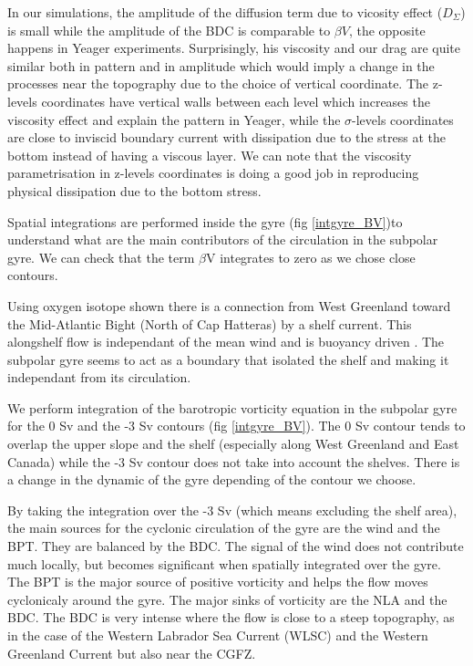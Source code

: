 \documentclass{ametsoc}
\begin{document}
In our simulations, the amplitude of the diffusion term due to vicosity effect ($D_{\Sigma}$) is small while the amplitude of the BDC is comparable to $\beta V$, the opposite happens in Yeager experiments. Surprisingly, his viscosity and our drag are quite similar both in pattern and in amplitude which would imply a change in the processes near the topography due to the choice of vertical coordinate. The z-levels coordinates have vertical walls between each level which increases the viscosity effect and explain the pattern in Yeager, while the $\sigma$-levels coordinates are close to inviscid boundary current with dissipation due to the stress at the bottom instead of having a viscous layer. We can note that the viscosity parametrisation  in z-levels coordinates is doing a good job in reproducing physical dissipation due to the bottom stress.


Spatial integrations are performed inside the gyre (fig \ref{intgyre_BV})to understand what are the main contributors of the circulation in the subpolar gyre. We can check that the term $\beta$V integrates to zero as we chose close contours.

Using oxygen isotope \citet{chapman1986,chapman1989} shown there is a connection from West Greenland toward the Mid-Atlantic Bight (North of Cap Hatteras) by a shelf current. This alongshelf flow is independant of the mean wind and is buoyancy driven \citep{csanady1978}. The subpolar gyre seems to act as a boundary that isolated the shelf and making it independant from its circulation. 

We perform integration of the barotropic vorticity equation in the subpolar gyre for the 0 Sv and the -3 Sv contours (fig \ref{intgyre_BV}). The 0 Sv contour tends to overlap the upper slope and the shelf (especially along West Greenland and East Canada) while the -3 Sv contour does not take into account the shelves. There is a change in the dynamic of the gyre depending of the contour we choose.

By taking the integration over the -3 Sv (which means excluding the shelf area), the main sources for the cyclonic circulation of the gyre are the wind and the BPT. They are balanced by the BDC. The signal of the wind does not contribute much locally, but becomes significant when spatially integrated over the gyre. The BPT is the major source of positive vorticity and helps the flow moves cyclonicaly around the gyre. The major sinks of vorticity are the NLA and the BDC. The BDC is very intense where the flow is close to a steep topography, as in the case of the Western Labrador Sea Current (WLSC) and the Western Greenland Current but also near the CGFZ. 
\end{document}
